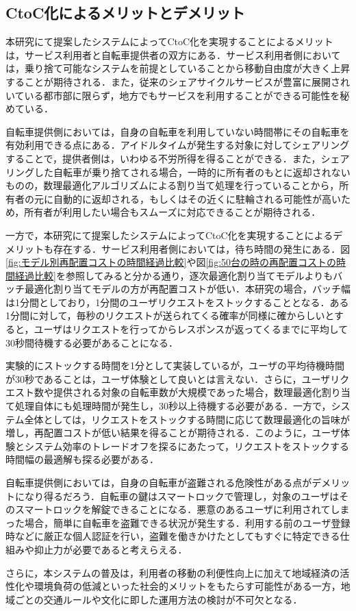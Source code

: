   \subsection{CtoC化によるメリットとデメリット}
    \label{sec:CtoC化によるメリットとデメリット}
      \par 本研究にて提案したシステムによってCtoC化を実現することによるメリットは，サービス利用者と自転車提供者の双方にある．サービス利用者側においては，乗り捨て可能なシステムを前提としていることから移動自由度が大きく上昇することが期待される．また，従来のシェアサイクルサービスが豊富に展開されいている都市部に限らず，地方でもサービスを利用することができる可能性を秘めている．
      \par 自転車提供側においては，自身の自転車を利用していない時間帯にその自転車を有効利用できる点にある．アイドルタイムが発生する対象に対してシェアリングすることで，提供者側は，いわゆる不労所得を得ることができる．また，シェアリングした自転車が乗り捨てされる場合，一時的に所有者のもとに返却されないものの，数理最適化アルゴリズムによる割り当て処理を行っていることから，所有者の元に自動的に返却される，もしくはその近くに駐輪される可能性が高いため，所有者が利用したい場合もスムーズに対応できることが期待される．
      \par 一方で，本研究にて提案したシステムによってCtoC化を実現することによるデメリットも存在する．サービス利用者側においては，待ち時間の発生にある．図\ref{fig:モデル別再配置コストの時間経過比較}や図\ref{fig:50台の時の再配置コストの時間経過比較}を参照してみると分かる通り，逐次最適化割り当てモデルよりもバッチ最適化割り当てモデルの方が再配置コストが低い．本研究の場合，バッチ幅は1分間としており，1分間のユーザリクエストをストックすることとなる．ある1分間に対して，毎秒のリクエストが送られてくる確率が同様に確からしいとすると，ユーザはリクエストを行ってからレスポンスが返ってくるまでに平均して30秒間待機する必要があることになる．
      \par 実験的にストックする時間を1分として実装しているが，ユーザの平均待機時間が30秒であることは，ユーザ体験として良いとは言えない．さらに，ユーザリクエスト数や提供される対象の自転車数が大規模であった場合，数理最適化割り当て処理自体にも処理時間が発生し，30秒以上待機する必要がある．一方で，システム全体としては，リクエストをストックする時間に応じて数理最適化の旨味が増し，再配置コストが低い結果を得ることが期待される．このように，ユーザ体験とシステム効率のトレードオフを探るにあたって，リクエストをストックする時間幅の最適解も探る必要がある．
      \par 自転車提供側においては，自身の自転車が盗難される危険性がある点がデメリットになり得るだろう．自転車の鍵はスマートロックで管理し，対象のユーザはそのスマートロックを解錠できることになる．悪意のあるユーザに利用されてしまった場合，簡単に自転車を盗難できる状況が発生する．利用する前のユーザ登録時などに厳正な個人認証を行い，盗難を働きかけたとしてもすぐに特定できる仕組みや抑止力が必要であると考えらえる．
      \par さらに，本システムの普及は，利用者の移動の利便性向上に加えて地域経済の活性化や環境負荷の低減といった社会的メリットをもたらす可能性がある一方，地域ごとの交通ルールや文化に即した運用方法の検討が不可欠となる．
      
